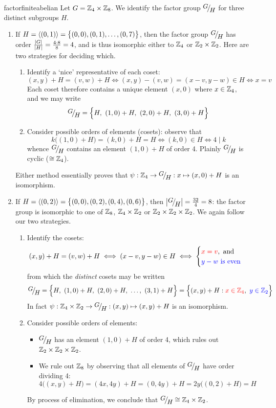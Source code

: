 \begin{examples}{}{factorfiniteabelian}
	Let $G=\mathbb{Z}_4\times\mathbb{Z}_8$. We identify the factor group $\quotient GH$ for three distinct subgroups $H$.
	\begin{enumerate}
	  \item If $H=\left\langle (0,1)\right\rangle=\bigl\{(0,0),(0,1),\ldots,(0,7)\bigr\}$, then the factor group $\quotient GH$ has order $\frac{\left| G\right|}{\left| H\right|}=\frac{4\cdot 8}8=4$, and is thus isomorphic either to $\mathbb{Z}_4$ or $\mathbb{Z}_2\times\mathbb{Z}_2$. Here are two strategies for deciding which.
	  \begin{enumerate}
		  \item Identify a `nice' representative of each coset:
			\[
				(x,y)+H=(v,w)+H\iff (x,y)-(v,w)=(x-v,y-w)\in H\iff x=v
			\]
			Each coset therefore contains a unique element $(x,0)$ where $x\in \mathbb{Z}_4$, and we may write
			\[
				\quotient{G}{H}=\Bigl\{H,\ (1,0)+H,\ (2,0)+H,\ (3,0)+H\Bigr\}
			\]
			\item Consider possible orders of elements (cosets): observe that
			\[
				k\bigl((1,0)+H\bigr) =(k,0)+H=H\iff (k,0)\in H\iff 4\mid k
			\]
			whence $\quotient GH$ contains an element $(1,0)+H$ of order 4. Plainly $\quotient GH$ is cyclic ($\cong \mathbb{Z}_4$).
		\end{enumerate}
		Either method essentially proves that $\psi:\Z_4\to\quotient GH:x\mapsto (x,0)+H$ is an isomorphism.
			
			 
	  \item If $H=\left\langle (0,2)\right\rangle=\bigl\{(0,0),(0,2),(0,4),(0,6)\bigr\}$, then $\nm{\quotient GH}=\frac{32}4=8$: the factor group is isomorphic to one of $\mathbb{Z}_8$, $\mathbb{Z}_4\times\mathbb{Z}_2$ or $\mathbb{Z}_2\times\mathbb{Z}_2\times\mathbb{Z}_2$. We again follow our two strategies.
		\begin{enumerate}
		  \item Identify the cosets:
			\[
				(x,y)+H=(v,w)+H\iff (x-v,y-w)\in H\iff 
				\begin{cases}
					\textcolor{red}{x=v},\text{ and}\\
					\textcolor{blue}{y-w\text{ is even}}
				\end{cases}
			\]
			from which the \emph{distinct} cosets may be written
			\[
				\quotient GH=\Bigl\{H,\ (1,0)+H,\ (2,0)+H,\ \ldots,\ (3,1)+H\Bigr\} =\Bigl\{(x,y)+H: \textcolor{red}{x\in\Z_4},\ \textcolor{blue}{y\in\Z_2}\Bigr\}
			\]
			In fact $\psi:\Z_4\times\Z_2\to\quotient GH:(x,y)\mapsto (x,y)+H$ is an isomorphism.
			\item Consider possible orders of elements:
			\begin{itemize}
	  		\item $\quotient GH$ has an element $(1,0)+H$ of order 4, which rules out $\mathbb{Z}_2\times\mathbb{Z}_2\times\mathbb{Z}_2$.
	  		\item We rule out $\mathbb{Z}_8$ by observing that all elements of $\quotient GH$ have order dividing 4:
	  		\[
	  			4\bigl((x,y)+H\bigr)
	  			=(4x,4y)+H
	  			=(0,4y)+H
	  			=2y\bigl((0,2)+H\bigr)
	  			=H
	  		\]
			\end{itemize}
			By process of elimination, we conclude that $\quotient GH\cong\Z_4\times\Z_2$.
	  \end{enumerate}


\end{enumerate}
\end{examples}

